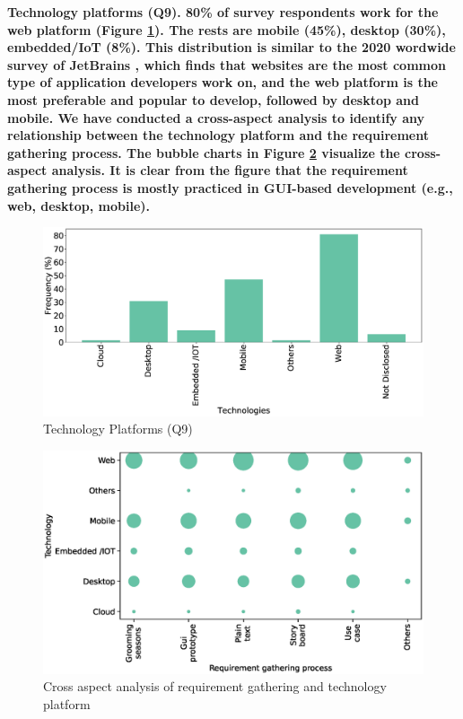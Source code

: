 \bf{Technology platforms (Q9).} 80\%  of survey respondents work for the web
platform (Figure \ref{fig:platforms}). The rests are mobile (45\%), desktop (30\%), embedded/IoT
(8\%). This distribution is similar to the 2020 wordwide survey of JetBrains \citep{JetBrains2020}, which finds that 
websites are the
most common type of application developers work on, and the web platform is the
most preferable and popular to develop, followed by desktop and mobile. We have conducted a cross-aspect analysis to identify any relationship
between the technology platform and the requirement gathering process. The
bubble charts in Figure \ref{fig:requirement technology cross analysis}
visualize the cross-aspect analysis. It is clear from the figure that the
requirement gathering process is mostly practiced in GUI-based development
(e.g., web, desktop, mobile).
\begin{figure}[t]
\centering
  \includegraphics[scale=0.18]{Figures/Respondents_Technologies}
  \caption{Technology Platforms (Q9)}
  \label{fig:platforms}
\end{figure}
\begin{figure}[t]
\centering
  \includegraphics[scale=0.47]{Figures/Requirement_Technology_Cross_Analysis.eps}
  \caption{Cross aspect analysis of requirement gathering and technology platform}
  \label{fig:requirement technology cross analysis}
\end{figure}


